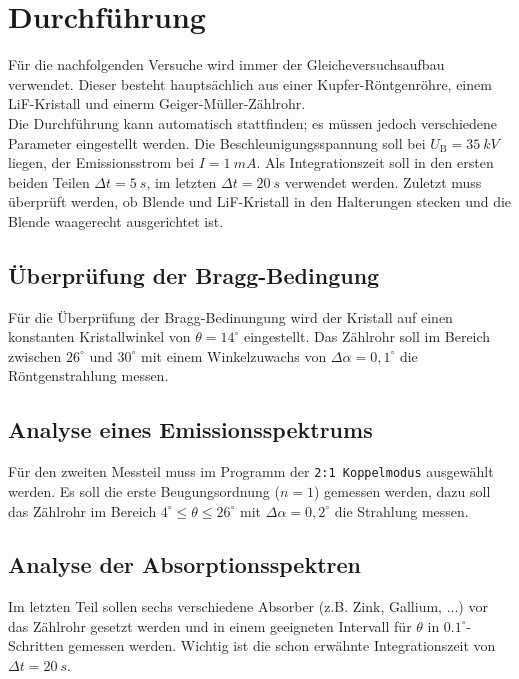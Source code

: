 \section{Durchführung}
\label{sec:Durchführung}
Für die nachfolgenden Versuche wird immer der Gleicheversuchsaufbau verwendet. Dieser
besteht hauptsächlich aus einer Kupfer-Röntgenröhre, einem LiF-Kristall und einerm
Geiger-Müller-Zählrohr.
\\
Die Durchführung kann automatisch stattfinden; es müssen jedoch verschiedene Parameter
eingestellt werden. Die Beschleunigungsspannung soll bei $U_\text{B}=\SI{35}{kV}$ liegen,
der Emissionsstrom bei $I = \SI{1}{mA}$. Als Integrationszeit soll in den ersten beiden
Teilen  $\Delta t = \SI{5}{s}$, im letzten $\Delta t = \SI{20}{s}$ verwendet werden. 
Zuletzt muss überprüft werden, ob Blende und LiF-Kristall in
den Halterungen stecken und die Blende waagerecht ausgerichtet ist.

\subsection{Überprüfung der Bragg-Bedingung}
\label{sec:Überprüfung der Bragg-Bedingung}
Für die Überprüfung der Bragg-Bedinungung wird der Kristall auf einen konstanten
Kristallwinkel von $\theta = 14^\circ$ eingestellt. Das Zählrohr soll im Bereich zwischen
$26^\circ$ und $30^\circ$ mit einem Winkelzuwachs von $\Delta \alpha = 0,1^\circ$ die
Röntgenstrahlung messen.

\subsection{Analyse eines Emissionsspektrums}
\label{sec:Analyse eines Emissionsspektrums}
Für den zweiten Messteil muss im Programm der \texttt{2:1 Koppelmodus} ausgewählt werden.
Es soll die erste Beugungsordnung ($n=1$) gemessen werden, dazu soll das Zählrohr im
Bereich $4^\circ \leq \theta \leq 26^\circ$ mit $\Delta \alpha = 0,2^\circ$ die Strahlung
messen.

\subsection{Analyse der Absorptionsspektren}
\label{sec:Analyse der Absorptionsspektren}
Im letzten Teil sollen sechs verschiedene Absorber (z.B. Zink, Gallium, ...) vor das
Zählrohr gesetzt werden und in einem geeigneten Intervall für $\theta$ in
$0.1^\circ$-Schritten gemessen werden. Wichtig ist die schon erwähnte Integrationszeit von
$\Delta t = \SI{20}{s}$.

